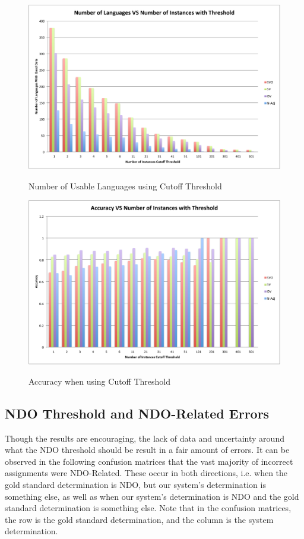 \documentclass[]{article}
\begin{document}
\begin{figure}[H]
\caption{Number of Usable Languages using Cutoff Threshold}
\hspace{-2mm} 
\includegraphics[width=\textwidth]{NumberOfLanguagesVsNumberOfInstancesWithThreshold.pdf}
\label{fig:label}
\end{figure}

\begin{figure}[H]
\caption{Accuracy when using Cutoff Threshold}
\hspace{-2mm} 
\includegraphics[width=\textwidth]{AccuracyVsNumberOfInstancesWithThreshold.pdf}
\label{fig:label}
\end{figure}

\subsection{NDO Threshold and NDO-Related Errors}
Though the results are encouraging, the lack of data and uncertainty around what the NDO threshold should be result in a fair amount of errors.  It can be observed in the following confusion matrices that the vast majority of incorrect assignments were NDO-Related.  These occur in both directions, i.e. when the gold standard determination is NDO, but our system's determination is something else, as well as when our system's determination is NDO and the gold standard determination is something else.  Note that in the confusion matrices, the row is the gold standard determination, and the column is the system determination.
\end{document}
